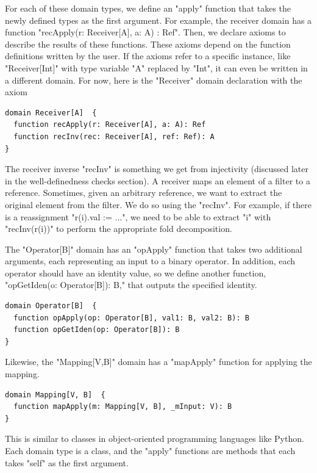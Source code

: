 \documentclass[msc,oneside]{ubcthesis}
\theoremstyle{definition}
\begin{document}
For each of these domain types, we define an "apply" function that takes the newly defined types as the first argument. For example, the receiver domain has a function "recApply(r: Receiver[A], a: A) : Ref". Then, we declare axioms to describe the results of these functions. These axioms depend on the function definitions written by the user. If the axioms refer to a specific instance, like "Receiver[Int]" with type variable "A" replaced by "Int", it can even be written in a different domain. For now, here is the "Receiver" domain declaration with the axiom
\begin{lstlisting}
domain Receiver[A]  {
  function recApply(r: Receiver[A], a: A): Ref 
  function recInv(rec: Receiver[A], ref: Ref): A 
}
\end{lstlisting}
The receiver inverse "recInv" is something we get from injectivity (discussed later in the well-definedness checks section). A receiver maps an element of a filter to a reference. Sometimes, given an arbitrary reference, we want to extract the original element from the filter.  We do so using the "recInv". For example, if there is a reassignment "r(i).val := ...", we need to be able to extract "i" with "recInv(r(i))" to perform the appropriate fold decomposition.

The "Operator[B]" domain has an "opApply" function that takes two additional arguments, each representing an input to a binary operator. In addition, each operator should have an identity value, so we define another function, "opGetIden(o: Operator[B]): B," that outputs the specified identity.
\begin{lstlisting}
domain Operator[B]  {
  function opApply(op: Operator[B], val1: B, val2: B): B 
  function opGetIden(op: Operator[B]): B 
}
\end{lstlisting}

Likewise, the "Mapping[V,B]" domain has a "mapApply" function for applying the mapping.
\begin{lstlisting}
domain Mapping[V, B]  {
  function mapApply(m: Mapping[V, B], _mInput: V): B 
}
\end{lstlisting}

This is similar to classes in object-oriented programming languages like Python. Each domain type is a class, and the "apply" functions are methods that each takes "self" as the first argument. 
\end{document}
